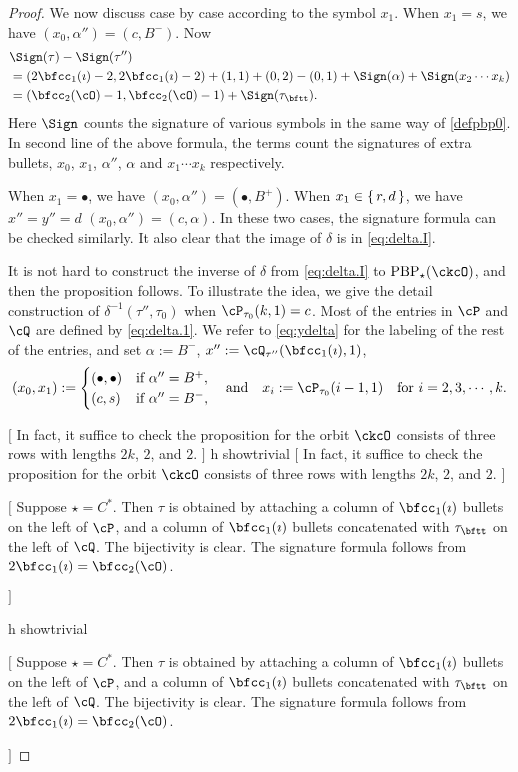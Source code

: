 \documentclass[12pt,a4paper]{amsart}
\newcommand{\trivial}[2][]{\if\relax\detokenize{#1}\relax
  {%
      \color{orange} \vspace{0em} $[$  #2 $]$
      \color{black}
  }
  \else
\ifx#1h
\ifcsname showtrivial\endcsname
{%
    \color{orange} \vspace{0em}  $[$ #2 $]$
    \color{black}
}
\fi
\else {\red Wrong argument!} \fi
\fi
}
\numberwithin{equation}{section}
\theoremstyle{remark}
\def\PBP{\mathrm{PBP}}
\begin{document}
\begin{proof}
We now discuss case by case according to the symbol $x_{1}$.
When $x_{1} = s$, we have $(x_{0}, \alpha'') = (c,B^{-})$.
Now
\begin{equation}\label{eq:sign.GD2}
  \begin{split}
    & \Sign(\tau) - \Sign(\tau'') \\
    &= (2\bfcc_{1}(\imath)-2,2\bfcc_{1}(\imath)-2)
    + (1,1) + (0,2) - (0,1) + \Sign(\alpha) + \Sign(x_{2}\cdots x_{k})\\
    & = (\bfcc_{2}(\cO)-1, \bfcc_{2}(\cO)-1)+ \Sign(\tau_{\bftt}).
  \end{split}
\end{equation}
Here $\Sign$ counts the signature of various symbols in the same way of \eqref{defpbp0}.
In second line of the above formula, the terms count the signatures of extra
bullets, $x_{0}$, $x_{1}$, $\alpha''$, $\alpha$ and $x_{1}\cdots x_{k}$ respectively.

When $x_{1} = \bullet$, we have $(x_{0}, \alpha'') = (\bullet,B^{+})$.
When $x_{1} \in \set{r,d}$, we have $x'' = y''= d$ $(x_{0}, \alpha'') = (c,\alpha)$.
In these two cases, the signature formula can be checked similarly. %
It also clear that the image of $\delta$ is in \eqref{eq:delta.I}.

It is not hard to construct the inverse of  $\delta$ from \eqref{eq:delta.I} to
$\PBP_{\star}(\ckcO)$, and then the proposition follows. To illustrate the idea,
we give the detail construction of $\delta^{-1}(\tau'',\tau_{0})$
when $\cP_{\tau_{0}}(k,1)=c$. Most of the entries in $\cP$ and $\cQ$ are defined
by \eqref{eq:delta.1}. We refer to \eqref{eq:ydelta} for the labeling of the
rest of the entries, and set $\alpha:=B^{-}$, $x'':= \cQ_{\tau''}(\bfcc_{1}(\imath),1)$,
\[
(x_{0},x_{1}) := \begin{cases}
  (\bullet,\bullet) & \text{if } \alpha''= B^{+},\\
  (c,s) & \text{if } \alpha''= B^{-},
\end{cases}
\quad \text{and}\quad
x_{i} := \cP_{\tau_{0}}(i-1,1) \quad \text{for } i = 2,3,\cdots,k.
\]

\trivial{
In fact, it suffice to check the proposition for the orbit $\ckcO$
consists of three rows with lengths $2k$, $2$, and $2$.
}



  \trivial{
    Suppose $\star =  C^{*}$.
    Then $\tau$ is obtained by attaching a column of $\bfcc_{1}(\imath)$
    bullets on the left of $\cP$, and a column of  $\bfcc_{1}(\imath)$
    bullets concatenated with $\tau_{\bftt}$ on the left of $\cQ$. The bijectivity is clear. The
    signature formula follows from $2\bfcc_{1}(\imath)  = \bfcc_{2}(\cO)$.


}
\end{proof}
\end{document}

